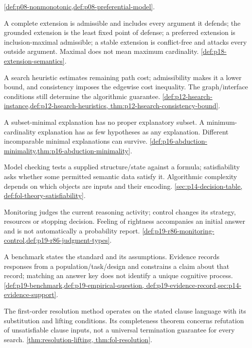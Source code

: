 \begin{description}[style=nextline,leftmargin=0pt]
\cref{def:p08-nonmonotonic,def:p08-preferential-model}.
\item[Extension: complete, grounded, preferred, stable.]
A complete extension is admissible and includes every argument it defends;
the grounded extension is the least fixed point of defense; a preferred
extension is inclusion-maximal admissible; a stable extension is
conflict-free and attacks every outside argument. Maximal does not mean
maximum cardinality. \cref{def:p18-extension-semantics}.
\item[Heuristic; admissible; consistent.]
A search heuristic estimates remaining path cost; admissibility makes it
a lower bound, and consistency imposes the edgewise cost inequality.
The graph/interface conditions still determine the algorithmic guarantee.
\cref{def:p12-hsearch-instance,def:p12-hsearch-heuristics,
thm:p12-hsearch-consistency-bound}.
\item[Minimal; minimum.]
A subset-minimal explanation has no proper explanatory subset. A
minimum-cardinality explanation has as few hypotheses as any explanation.
Different incomparable minimal explanations can survive.
\cref{def:p16-abduction-minimality,thm:p16-abduction-minimality}.
\item[Model checking; satisfiability.]
Model checking tests a supplied structure/state against a formula;
satisfiability asks whether some permitted semantic data satisfy it.
Algorithmic complexity depends on which objects are inputs and their
encoding. \cref{sec:p14-decision-table,
def:fol-theory-satisfiability}.
\item[Monitoring; control; feeling of rightness.]
Monitoring judges the current reasoning activity; control changes its
strategy, resources or stopping decision. Feeling of rightness accompanies
an initial answer and is not automatically a probability report.
\cref{def:p19-r86-monitoring-control,def:p19-r86-judgment-types}.
\item[Normative benchmark; empirical evidence.]
A benchmark states the standard and its assumptions. Evidence records
responses from a population/task/design and constrains a claim about that
record; matching an answer key does not identify a unique cognitive process.
\cref{def:p19-benchmark,def:p19-empirical-question,
def:p19-evidence-record,sec:p14-evidence-support}.
\item[Resolution; refutation.]
The first-order resolution method operates on the stated clause language
with its substitution and lifting conditions. Its completeness theorem
concerns refutation of unsatisfiable clause inputs, not a universal
termination guarantee for every search. \cref{thm:resolution-lifting,
thm:fol-resolution}.
\end{description}

